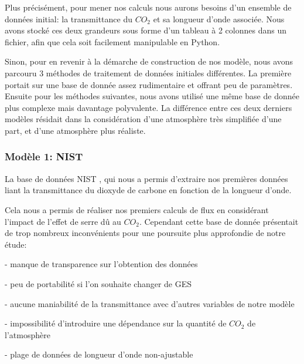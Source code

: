 \documentclass[a4paper, 12pt]{report} %
\begin{document}
    Plus précisément, pour mener nos calculs nous aurons besoins d'un 
ensemble de données initial: la transmittance du $CO_2$ et sa longueur d'onde associée. Nous avons stocké ces deux grandeurs sous forme d'un tableau à 2 colonnes dans un fichier, afin que cela soit facilement manipulable en Python. \vspace{\baselineskip}

    Sinon, pour en revenir à la démarche de construction de nos
modèle, nous avons parcouru 3 méthodes de traitement de données initiales différentes. La première portait sur une base de donnée assez rudimentaire et offrant peu de paramètres. Ensuite pour les méthodes suivantes, nous avons utilisé une même base de donnée plus complexe mais davantage polyvalente. La différence entre ces deux derniers modèles résidait dans la considération d'une atmosphère très simplifiée d'une part, et d'une atmosphère plus réaliste.

\subsubsection{Modèle 1: NIST}

    La base de données NIST
, qui nous a permis d'extraire nos premières données liant la transmittance du dioxyde de carbone en fonction de la longueur d'onde. \vspace{\baselineskip}

    Cela nous a permis de réaliser nos premiers calculs de flux en
considérant l'impact de l'effet de serre dû au $CO_2$. Cependant cette base de donnée présentait de trop nombreux inconvénients pour une poursuite plus approfondie de notre étude: \newline
    \par - manque de transparence sur l'obtention des données 
    \par - peu de portabilité si l'on souhaite changer de GES
    \par - aucune maniabilité de la transmittance avec d'autres variables de notre modèle
    \par - impossibilité d'introduire une dépendance sur la quantité de $CO_2$ de l'atmosphère
    \par - plage de données de longueur d'onde non-ajustable
\end{document}
